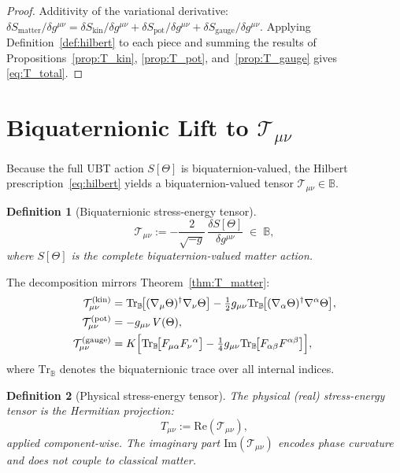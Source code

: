 \documentclass[12pt]{article}
\newtheorem{definition}{Definition}[section]
\newcommand{\B}{\mathbb{B}}
\newcommand{\Tr}{\mathrm{Tr}}
\newcommand{\re}{\mathrm{Re}}
\newcommand{\im}{\mathrm{Im}}
\newcommand{\calT}{\mathcal{T}}
\begin{document}
\begin{proof}
Additivity of the variational derivative:
$\delta S_{\mathrm{matter}}/\delta g^{\mu\nu}
= \delta S_{\mathrm{kin}}/\delta g^{\mu\nu}
+ \delta S_{\mathrm{pot}}/\delta g^{\mu\nu}
+ \delta S_{\mathrm{gauge}}/\delta g^{\mu\nu}$.
Applying Definition~\ref{def:hilbert} to each piece and summing the results
of Propositions~\ref{prop:T_kin}, \ref{prop:T_pot}, and~\ref{prop:T_gauge}
gives \eqref{eq:T_total}.
\end{proof}

\section{Biquaternionic Lift to $\mathcal{T}_{\mu\nu}$}
\label{sec:calT}

Because the full UBT action $S[\Theta]$ is biquaternion-valued, the Hilbert
prescription~\eqref{eq:hilbert} yields a biquaternion-valued tensor
$\calT_{\mu\nu} \in \B$.

\begin{definition}[Biquaternionic stress-energy tensor]
\label{def:calT}
\begin{equation}
  \label{eq:calT_def}
  \calT_{\mu\nu}
  := -\frac{2}{\sqrt{-g}}\,\frac{\delta S[\Theta]}{\delta g^{\mu\nu}}
  \;\in\; \B,
\end{equation}
where $S[\Theta]$ is the complete biquaternion-valued matter action.
\end{definition}

The decomposition mirrors Theorem~\ref{thm:T_matter}:
\begin{align}
  \calT^{(\mathrm{kin})}_{\mu\nu}
    &= \Tr_{\B}\!\bigl[(\nabla_\mu\Theta)^\dagger\nabla_\nu\Theta\bigr]
       - \tfrac{1}{2}g_{\mu\nu}
         \Tr_{\B}\!\bigl[(\nabla_\alpha\Theta)^\dagger\nabla^\alpha\Theta\bigr],
       \label{eq:calT_kin} \\
  \calT^{(\mathrm{pot})}_{\mu\nu}
    &= -g_{\mu\nu}\,V(\Theta),
       \label{eq:calT_pot} \\
  \calT^{(\mathrm{gauge})}_{\mu\nu}
    &= K\Bigl[
         \Tr_{\B}\!\bigl[F_{\mu\alpha}F_\nu{}^\alpha\bigr]
         - \tfrac{1}{4}g_{\mu\nu}\Tr_{\B}\!\bigl[F_{\alpha\beta}F^{\alpha\beta}\bigr]
       \Bigr],
       \label{eq:calT_gauge}
\end{align}
where $\Tr_{\B}$ denotes the biquaternionic trace over all internal indices.

\begin{definition}[Physical stress-energy tensor]
The \emph{physical (real) stress-energy tensor} is the Hermitian projection:
\begin{equation}
  \label{eq:T_real_proj}
  T_{\mu\nu} := \re(\calT_{\mu\nu}),
\end{equation}
applied component-wise.  The imaginary part $\im(\calT_{\mu\nu})$ encodes
phase curvature and does not couple to classical matter.
\end{definition}
\end{document}
